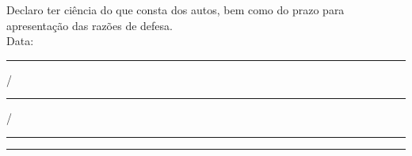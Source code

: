 \assinaturaSindicante

\vspace{0.8cm}

\noindent Declaro ter ciência do que consta dos autos, bem como do prazo para apresentação das razões de defesa.\\[0.8em]
\noindent Data: \rule{1.2cm}{0.4pt}/\rule{1.2cm}{0.4pt}/\rule{1.8cm}{0.4pt}

\vspace{3em}

\begin{center}
\rule{8cm}{0.4pt}\\
\getSindicadoPosto\ \getSindicadoNome
\end{center}

\clearpage
